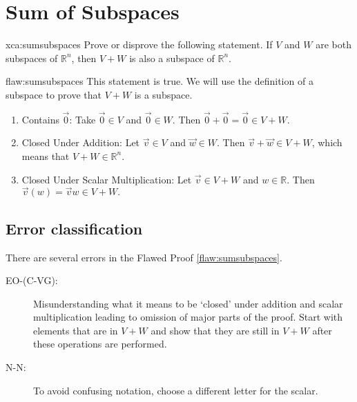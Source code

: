 \section{Sum of Subspaces}

\begin{xca}[]{xca:sumsubspaces}
Prove or disprove the following statement. If $V$ and $W$ are both subspaces of $\mathbb{R}^n$, then $V+W$ is also a subspace of $\mathbb{R}^n$.
\end{xca}

\begin{flaw}{flaw:sumsubspaces}
This statement is true. We will use the definition of a subspace to prove that $V+W$ is a subspace.

\begin{enumerate}
\item Contains $\vec{0}$: Take $\vec{0} \in V$ and $\vec{0} \in W$. Then $\vec{0} + \vec{0} = \vec{0} \in V + W.$
\item Closed Under Addition: Let $\vec{v} \in V$ and $\vec{w} \in W$. Then $\vec{v} + \vec{w} \in V+W$, which means that $V+W \in \mathbb{R}^n.$
\item Closed Under Scalar Multiplication: Let  $\vec{v} \in V+W$ and $w \in \mathbb{R}.$ Then $\vec{v}(w)= \vec{v}w \in V+W.$
\end{enumerate}
\end{flaw}

\clearpage
\subsection{Error classification}


There are several errors
 in the Flawed Proof \ref{flaw:sumsubspaces}.

\begin{description}
 	\item[EO-(C-VG):] Misunderstanding what it means to be `closed' under addition and scalar multiplication leading to omission of major parts of the proof. Start with elements that are in $V+W$ and show that they are still in $V+W$ after these operations are performed.
 	\item[N-N:] To avoid confusing notation, choose a different letter for the scalar.

 \end{description}


